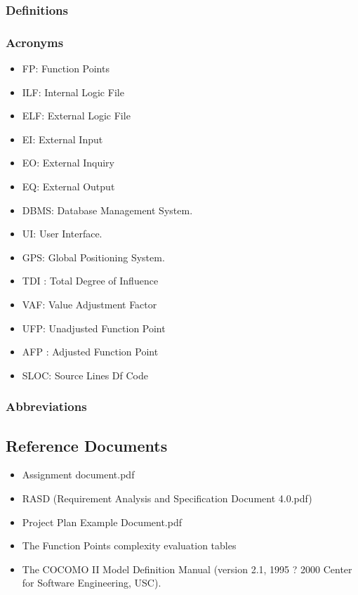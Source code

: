 \documentclass{article}
\begin{document}
\begin{flushleft}
\subsubsection{Definitions} %




\subsubsection{Acronyms} %
\begin{itemize}

\item{ FP: Function Points}
\item{ILF: Internal Logic File}
\item{ELF: External Logic File}
\item{ EI: External Input}
\item{ EO: External Inquiry}
\item{ EQ: External Output}
\item{DBMS: Database Management System.}
\item{UI: User Interface.}
\item{GPS: Global Positioning System.}
\item{TDI : Total Degree of Influence}
\item{VAF: Value Adjustment Factor}
\item {UFP: Unadjusted Function Point}
\item{AFP : Adjusted Function Point}
\item{SLOC: Source Lines Df Code}
\


\end{itemize}



\subsubsection{Abbreviations} %


\subsection{Reference Documents} %
\begin{itemize}
\item{Assignment document.pdf}
\item{RASD (Requirement Analysis and Specification Document 4.0.pdf)}
\item{Project Plan Example Document.pdf}
\item{The Function Points complexity evaluation tables}
\item The COCOMO II Model Definition Manual (version 2.1, 1995 ? 2000
Center for Software Engineering, USC).


\end{itemize}
\end{flushleft}
\end{document}
